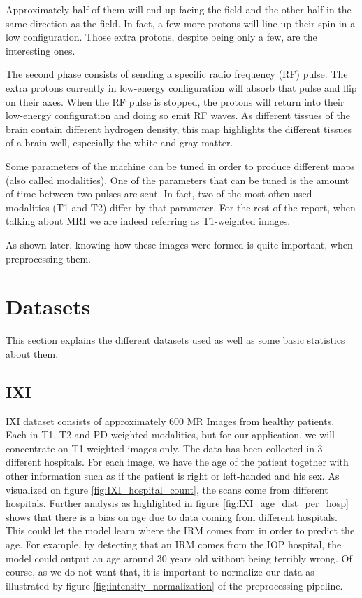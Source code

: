 Approximately half of them will end up facing the field and the other half in the same direction as the field. In fact, a few more protons will line up their spin in a low configuration. Those extra protons, despite being only a few, are the interesting ones.

The second phase consists of sending a specific radio frequency (RF) pulse. The extra protons currently in low-energy configuration will absorb that pulse and flip on their axes.  When the RF pulse is stopped, the protons will return into their low-energy configuration and doing so emit RF waves. As different tissues of the brain contain different hydrogen density, this map highlights the different tissues of a brain well, especially the white and gray matter.

Some parameters of the machine can be tuned in order to produce different maps (also called modalities). One of the parameters that can be tuned is the amount of time between two pulses are sent. In fact, two of the most often used modalities (T1 and T2) differ by that parameter. For the rest of the report, when talking about MRI we are indeed referring as T1-weighted images.

As shown later, knowing how these images were formed is quite important, when preprocessing them.

\section{Datasets}
This section explains the different datasets used as well as some basic statistics about them.
\subsection{IXI}
IXI dataset consists of approximately 600 MR Images from healthy patients. Each in T1, T2 and PD-weighted modalities, but for our application, we will concentrate on T1-weighted images only. The data has been collected in 3 different hospitals. For each image, we have the age of the patient together with other information such as if the patient is right or left-handed and his sex. As visualized on figure \ref{fig:IXI_hospital_count}, the scans come from different hospitals. Further analysis as highlighted in figure \ref{fig:IXI_age_dist_per_hosp} shows that there is a bias on age due to data coming from different hospitals. This could let the model learn where the IRM comes from in order to predict the age. For example, by detecting that an IRM comes from the IOP hospital, the model could output an age around 30 years old without being terribly wrong. Of course, as we do not want that, it is important to normalize our data as illustrated by figure \ref{fig:intensity_normalization} of the preprocessing pipeline.

